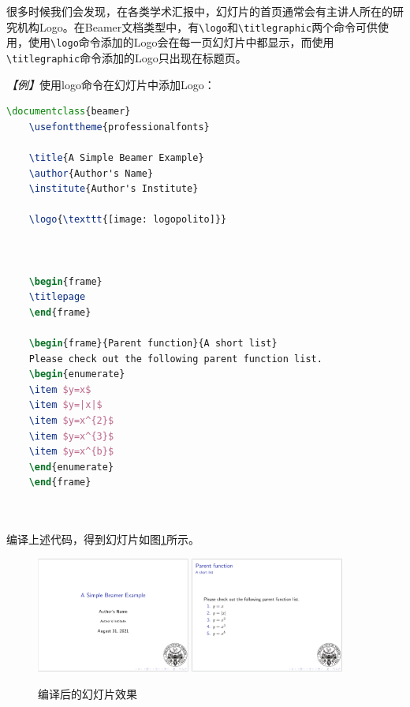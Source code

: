很多时候我们会发现，在各类学术汇报中，幻灯片的首页通常会有主讲人所在的研究机构Logo。在Beamer文档类型中，有\texttt{\textbackslash{}logo}和\texttt{\textbackslash{}titlegraphic}两个命令可供使用，使用\texttt{\textbackslash{}logo}命令添加的Logo会在每一页幻灯片中都显示，而使用\texttt{\textbackslash{}titlegraphic}命令添加的Logo只出现在标题页。

\emph{【例】}使用logo命令在幻灯片中添加Logo：
\begin{lstlisting}[language=TeX]
    \documentclass{beamer}
    \usefonttheme{professionalfonts}

    \title{A Simple Beamer Example}
    \author{Author's Name}
    \institute{Author's Institute}

    \logo{\texttt{[image: logopolito]}}

    

    \begin{frame}
    \titlepage
    \end{frame}

    \begin{frame}{Parent function}{A short list}
    Please check out the following parent function list.
    \begin{enumerate}
    \item $y=x$
    \item $y=|x|$
    \item $y=x^{2}$
    \item $y=x^{3}$
    \item $y=x^{b}$
    \end{enumerate}
    \end{frame}

    
\end{lstlisting}

编译上述代码，得到幻灯片如图\ref{figeg:010}所示。

\begin{figure}[htbp]
    \centering
    \includegraphics[width = 0.45\textwidth]{images/ch_9/example_sec2_7_0.png}
    \includegraphics[width = 0.45\textwidth]{images/ch_9/example_sec2_7_1.png}
    \caption{编译后的幻灯片效果}
    \label{figeg:010}
\end{figure}


